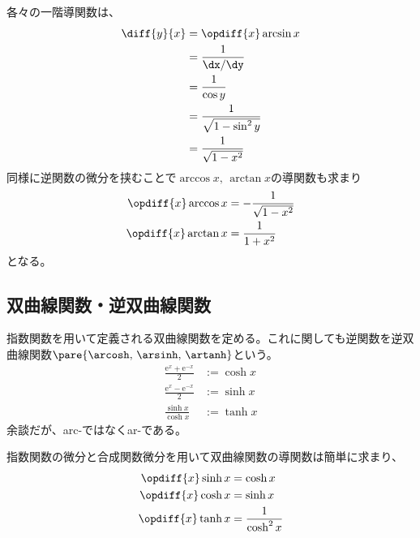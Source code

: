 各々の一階導関数は、
\begin{align}
    \begin{aligned}
        \diff{y}{x} & =\opdiff{x}\arcsin x        \\
                    & =\frac{1}{\dx/\dy}          \\
                    & =\frac{1}{\cos y}           \\
                    & =\frac{1}{\sqrt{1-\sin^2y}} \\
                    & =\frac{1}{\sqrt{1-x^2}}
    \end{aligned}
\end{align}
同様に逆関数の微分を挟むことで$\arccos x,\,\arctan x$の導関数も求まり
\begin{align}
    \opdiff{x}\arccos x & =-\frac{1}{\sqrt{1-x^2}} \\
    \opdiff{x}\arctan x & =\frac{1}{1+x^2}
\end{align}
となる。
\subsection{双曲線関数・逆双曲線関数}
指数関数を用いて定義される双曲線関数を定める。これに関しても逆関数を逆双曲線関数$\pare{\arcosh,\,\arsinh,\,\artanh}$という。
\begin{align}
    \frac{\mathrm{e}^x+\mathrm{e}^{-x}}{2} & :=\cosh x \\
    \frac{\mathrm{e}^x-\mathrm{e}^{-x}}{2} & :=\sinh x \\
    \frac{\sinh x}{\cosh x}                & :=\tanh x 
\end{align}
余談だが、arc-ではなくar-である。

指数関数の微分と合成関数微分を用いて双曲線関数の導関数は簡単に求まり、
\begin{align}
    \begin{aligned}
    \opdiff{x}\sinh x&=\cosh x\\
    \opdiff{x}\cosh x&=\sinh x\\
    \opdiff{x}\tanh x&=\frac{1}{\cosh^2x}
\end{aligned}
\end{align}